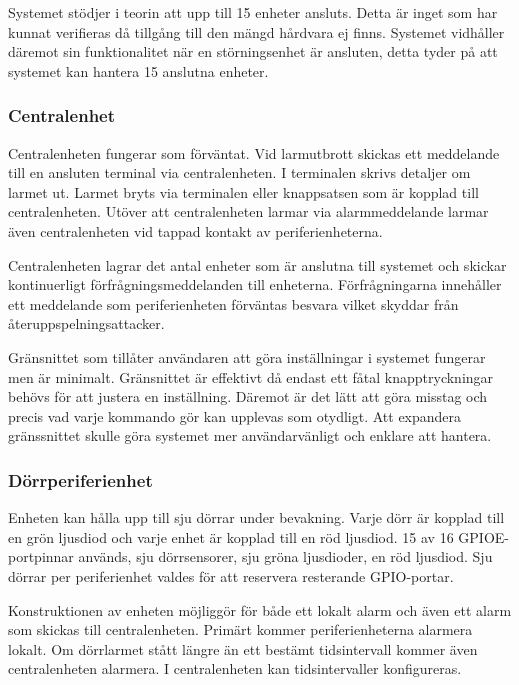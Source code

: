 \documentclass[a4paper]{article}
\newcommand{\todo}[1]{\marginpar{TODO: #1}\vspace{1cm}}
\begin{document}
Systemet stödjer i teorin att upp till 15 enheter ansluts. Detta är inget som har kunnat verifieras då tillgång till den mängd hårdvara ej finns.
Systemet vidhåller däremot sin funktionalitet när en störningsenhet är ansluten, detta tyder på att systemet kan hantera 15 anslutna enheter.

\subsubsection{Centralenhet}
Centralenheten fungerar som förväntat. Vid larmutbrott skickas ett meddelande till en ansluten terminal via centralenheten. I terminalen skrivs detaljer om larmet ut. Larmet bryts via terminalen eller knappsatsen som är kopplad till centralenheten. Utöver att centralenheten larmar via alarmmeddelande larmar även centralenheten vid tappad kontakt av periferienheterna.

Centralenheten lagrar det antal enheter som är anslutna till systemet och skickar kontinuerligt förfrågningsmeddelanden till enheterna. Förfrågningarna innehåller ett meddelande som periferienheten förväntas besvara vilket skyddar från återuppspelningsattacker.

Gränsnittet som tillåter användaren att göra inställningar i systemet fungerar men är minimalt.
Gränsnittet är effektivt då endast ett fåtal knapptryckningar behövs för att justera en inställning.
Däremot är det lätt att göra misstag och precis vad varje kommando gör kan upplevas som otydligt.
Att expandera gränssnittet skulle göra systemet mer användarvänligt och enklare att hantera.

\subsubsection{Dörrperiferienhet}
\todo{Motivera varför 7 dörrar används}
Enheten kan hålla upp till sju dörrar under bevakning.
Varje dörr är kopplad till en grön ljusdiod och varje enhet är kopplad till en röd ljusdiod.
15 av 16 GPIOE-portpinnar används, sju dörrsensorer, sju gröna ljusdioder, en röd ljusdiod.
Sju dörrar per periferienhet valdes för att reservera resterande GPIO-portar.

Konstruktionen av enheten möjliggör för både ett lokalt alarm och även ett alarm som skickas till centralenheten.
Primärt kommer periferienheterna alarmera lokalt.
Om dörrlarmet stått längre än ett bestämt tidsintervall kommer även centralenheten alarmera.
I centralenheten kan tidsintervaller konfigureras.
\end{document}
